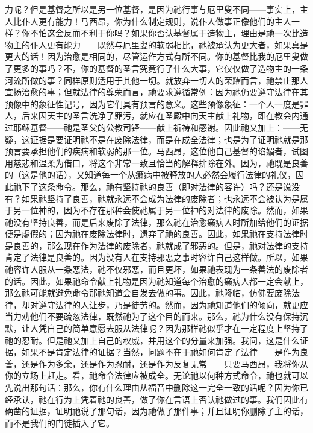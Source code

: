 力呢？但是基督之所以是另一位基督，是因为祂行事与厄里叟不同——事实上，主人比仆人更有能力！马西昂，你为什么制定规则，说仆人做事正像他们的主人一样？你不怕这会反而不利于你吗？如果你否认基督属于造物主，理由是祂一次比造物主的仆人更有能力——既然与厄里叟的软弱相比，祂被承认为更大者，如果真是更大的话！因为治愈是相同的，尽管运作方式有所不同。你的基督比我的厄里叟做了更多的事吗？不，你的基督的圣言究竟行了什么大事，它仅仅做了造物主的一条河流所做的事？同样原则适用于其他一切。就放弃一切人的荣耀而言，祂禁止那人宣扬治愈的事；但就法律的尊荣而言，祂要求遵循常例：因为祂仍要遵守法律在其预像中的象征性记号，因为它们具有预言的意义。这些预像象征：一个人一度是罪人，后来因天主的圣言洗净了罪污，就应在圣殿中向天主献上礼物，即在教会内通过耶稣基督——祂是圣父的公教司铎——献上祈祷和感谢。因此祂又加上：——无疑，这证据是要证明祂不是在废除法律，而是在成全法律；也是为了证明祂就是那预言要承担他们的疾病和软弱的那一位。马西昂，这位他自己基督的谄媚者，试图用慈悲和温柔为借口，将这个非常一致且恰当的解释排除在外。因为，祂既是良善的（这是他的话），又知道每一个从癞病中被释放的人必然会履行法律的礼仪，因此祂下了这条命令。那么，祂有坚持祂的良善（即对法律的容许）吗？还是说没有？如果祂坚持了良善，祂就永远不会成为法律的废除者；也永远不会被认为是属于另一位神的，因为不存在那种会使祂属于另一位神的对法律的废除。然而，如果祂没有坚持良善，而是后来废除了法律，那么祂在治愈癞病人时所加给他们的证据便是虚假的；因为祂在废除法律时，遗弃了祂的良善。因此，如果祂在支持法律时是良善的，那么现在作为法律的废除者，祂就成了邪恶的。但是，祂对法律的支持肯定了法律是良善的。因为没有人在支持邪恶之事时容许自己这样做。所以，如果祂容许人服从一条恶法，祂不仅邪恶，而且更坏，如果祂表现为一条善法的废除者的话。因此，如果祂命令献上礼物是因为祂知道每个治愈的癞病人都一定会献上，那么祂可能就避免命令那祂知道会自发去做的事。因此，祂降临，仿佛要废除法律，却对遵守法律的人让步，乃是徒劳的。然而，因为祂知道他们的倾向，就更应当力劝他们不要疏忽法律，既然祂为了这个目的而来。那么，祂为什么没有保持沉默，让人凭自己的简单意愿去服从法律呢？因为那样祂似乎才在一定程度上坚持了祂的忍耐。但是祂又加上自己的权威，并用这个的分量来加强。我问，这是什么证据，如果不是肯定法律的证据？当然，问题不在于祂如何肯定了法律——是作为良善，还是作为多余，还是作为忍耐，还是作为反复无常——只要马西昂，我将你从你的立场上赶走。看，祂命令法律应被成全。无论祂以何种方式命令，祂也就可以先说出那句话：那么，你有什么理由从福音中删除这一完全一致的话呢？因为你已经承认，祂在行为上凭着祂的良善，做了你在言语上否认祂做过的事。我们因此有确凿的证据，证明祂说了那句话，因为祂做了那件事；并且证明你删除了主的话，而不是我们的门徒插入了它。\par

